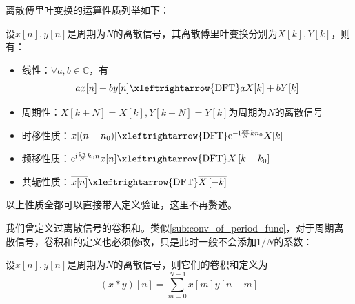 离散傅里叶变换的运算性质列举如下：
\begin{proposition}[离散傅里叶变换的运算性质]
    设$x[n],y[n]$是周期为$N$的离散信号，其离散傅里叶变换分别为$X[k],Y[k]$，则有：\begin{itemize}
        \item  线性：$\forall a,b\in\mathbb{C}$，有
    \[a x[n]+b y[n]\xleftrightarrow{\text{DFT}} a X[k]+b Y[k]\]
        \item 周期性：$X[k+N]=X[k],Y[k+N]=Y[k]$为周期为$N$的离散信号
        \item 时移性质：$x[(n-n_0)]\xleftrightarrow{\text{DFT}}\mathrm{e}^{-\mathrm{i}\frac{2\pi}{N}kn_0}X[k]$
        \item 频移性质：$\mathrm{e}^{\mathrm{i}\frac{2\pi}{N}k_0 n}x[n]\xleftrightarrow{\text{DFT}}X\left[k-k_0\right]$
        \item 共轭性质：$\overline{x[n]}\xleftrightarrow{\text{DFT}}\overline{X\left[-k\right]}$
    \end{itemize}
\end{proposition}

以上性质全都可以直接带入定义验证，这里不再赘述。

我们曾定义过离散信号的卷积和。类似\ref{sub:conv_of_period_func}，对于周期离散信号，卷积和的定义也必须修改，只是此时一般不会添加$1/N$的系数：
\begin{definition}[周期离散信号的卷积和]
    设$x[n],y[n]$是周期为$N$的离散信号，则它们的卷积和定义为
    \[(x*y)[n]=\sum_{m=0}^{N-1}x[m]y[n-m]\]
\end{definition}

